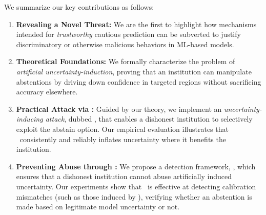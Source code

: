

We summarize our key contributions as follows:
\begin{enumerate}
    \item \textbf{Revealing a Novel Threat:} We are the first to highlight how mechanisms intended for \emph{trustworthy} cautious prediction can be subverted to justify discriminatory or otherwise malicious behaviors in ML-based models.
    \item \textbf{Theoretical Foundations:} We formally characterize the problem of \emph{artificial uncertainty-induction}, proving that an institution can manipulate abstentions by driving down confidence in targeted regions without sacrificing accuracy elsewhere.
    \item \textbf{Practical Attack via \attack:} Guided by our theory, we implement an \emph{uncertainty-inducing attack}, dubbed \attack, that enables a dishonest institution to selectively exploit the abstain option. Our empirical evaluation illustrates that \attack~consistently and reliably inflates uncertainty where it benefits the institution.
    \item \textbf{Preventing Abuse through \name:} We propose a detection framework, \name, which ensures that a dishonest institution cannot abuse artificially induced uncertainty. Our experiments show that \name\ is effective at detecting calibration mismatches (such as those induced by \attack), verifying whether an abstention is made based on legitimate model uncertainty or not. %
\end{enumerate}


